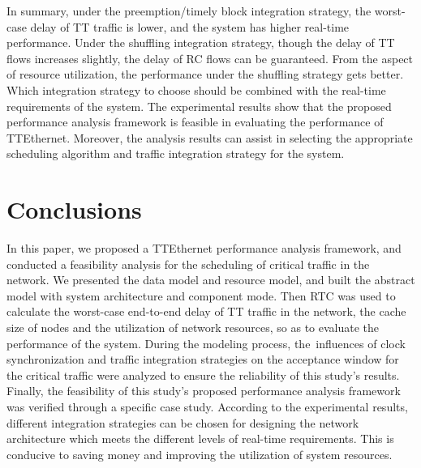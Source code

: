 \documentclass[electronics,article,accept,moreauthors,pdftex]{Definitions/mdpi}
\begin{document}
In summary, under the preemption/timely block integration strategy, the worst-case delay of TT traffic is lower, and the system has higher real-time performance. Under the shuffling integration strategy, though the delay of TT flows increases slightly, the delay of RC flows can be guaranteed. From the aspect of resource utilization, the performance under the shuffling strategy gets better. Which integration strategy to choose should be combined with the real-time requirements of the system. The experimental results show that the proposed performance analysis framework is feasible in evaluating the performance of TTEthernet. Moreover, the analysis results can assist in selecting the appropriate scheduling algorithm and traffic integration strategy for the system.

\section{Conclusions}
\label{con}
In this paper, we proposed a TTEthernet performance analysis framework, and conducted a feasibility analysis for the scheduling of critical traffic in the network. We presented the data model and resource model, and built the abstract model with system architecture and component mode. Then RTC was used to calculate the worst-case end-to-end delay of TT traffic in the network, the cache size of nodes and the utilization of network resources, so as to evaluate the performance of the system. During the modeling process, the~influences of clock synchronization and traffic integration strategies on the acceptance window for the critical traffic were analyzed to ensure the reliability of this study's results. Finally, the feasibility of this study's proposed performance analysis framework was verified through a specific case study. According to the experimental results, different integration strategies can be chosen for designing the network architecture which meets the different levels of real-time requirements. This is conducive to saving money and improving the utilization of system resources.


\vspace{6pt}
\end{document}
